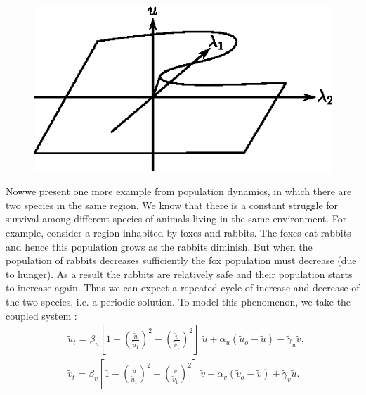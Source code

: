 \begin{figure}[H]
\centering 
\includegraphics[scale=.95]{vol79-fig/fig79-12.eps}
\smallskip
\caption{}
\label{chap1-sec1.2-fig1.12}
\end{figure}


Now\pageoriginale we present one more example from population dynamics, in which
there are two species in the same region. We know that there is a
constant struggle for survival among different species of animals
living in the same environment. For example, consider a region
inhabited by foxes and rabbits. The foxes eat rabbits and hence this
population grows as the rabbits diminish. But when the population of
rabbits decreases sufficiently the fox population must decrease (due
to hunger). As a result the rabbits are relatively safe and their
population starts to increase again. Thus we can expect a repeated
cycle of increase and decrease of the two species, i.e. a periodic
solution. To model this phenomenon, we take the coupled system :   
\begin{equation*}
\begin{split}
& \tilde{u}_{t} = \beta_{u} [1 - (\frac{\tilde{u}}{\tilde{u}_{1}})^{2} -
  (\frac{\tilde{v}}{\tilde{v}_{1}})^{2}]~ \tilde{u} + \alpha_{u}
(\tilde{u}_{o} - \tilde{u}) - \tilde{\gamma}_{u} \tilde{v},\\ 
& \tilde{v}_{t} = \beta_{v} [1 - (\frac{\tilde{u}}{\tilde{u}_{1}})^{2} -
  (\frac{\tilde{v}}{\tilde{v}_{1}})^{2}]~ \tilde{v} + \alpha_{v}
(\tilde{v}_{o} - \tilde{v}) + \tilde{\gamma}_{v} \tilde{u}.
\end{split}
\tag{1.22} \label{chap1-sec1.2-eq1.22}
\end{equation*}

